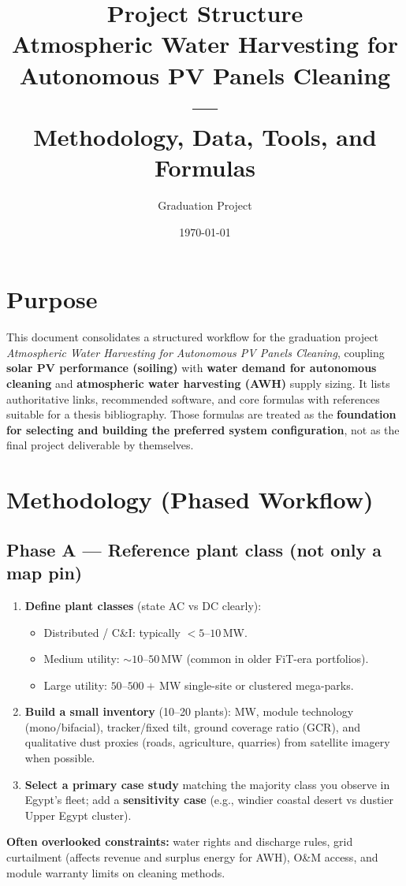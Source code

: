\documentclass[11pt,a4paper]{article}
\title{\textbf{Project Structure}\\[0.35em]
\large Atmospheric Water Harvesting for Autonomous PV Panels Cleaning ---\\
Methodology, Data, Tools, and Formulas}
\author{Graduation Project}
\date{\today}
\begin{document}
\maketitle
\tableofcontents
\newpage

\section{Purpose}
This document consolidates a structured workflow for the graduation project \textit{Atmospheric Water Harvesting for Autonomous PV Panels Cleaning}, coupling \textbf{solar PV performance (soiling)} with \textbf{water demand for autonomous cleaning} and \textbf{atmospheric water harvesting (AWH)} supply sizing. It lists authoritative links, recommended software, and core formulas with references suitable for a thesis bibliography. Those formulas are treated as the \textbf{foundation for selecting and building the preferred system configuration}, not as the final project deliverable by themselves.

\section{Methodology (Phased Workflow)}

\subsection{Phase A --- Reference plant class (not only a map pin)}
\begin{enumerate}[leftmargin=*]
  \item \textbf{Define plant classes} (state AC vs DC clearly):
  \begin{itemize}[nosep]
    \item Distributed / C\&I: typically $<5$--$10$\,MW.
    \item Medium utility: $\sim 10$--$50$\,MW (common in older FiT-era portfolios).
    \item Large utility: $50$--$500{+}$\,MW single-site or clustered mega-parks.
  \end{itemize}
  \item \textbf{Build a small inventory} (10--20 plants): MW, module technology (mono/bifacial), tracker/fixed tilt, ground coverage ratio (GCR), and qualitative dust proxies (roads, agriculture, quarries) from satellite imagery when possible.
  \item \textbf{Select a primary case study} matching the majority class you observe in Egypt's fleet; add a \textbf{sensitivity case} (e.g., windier coastal desert vs dustier Upper Egypt cluster).
\end{enumerate}
\textbf{Often overlooked constraints:} water rights and discharge rules, grid curtailment (affects revenue and surplus energy for AWH), O\&M access, and module warranty limits on cleaning methods.
\end{document}
